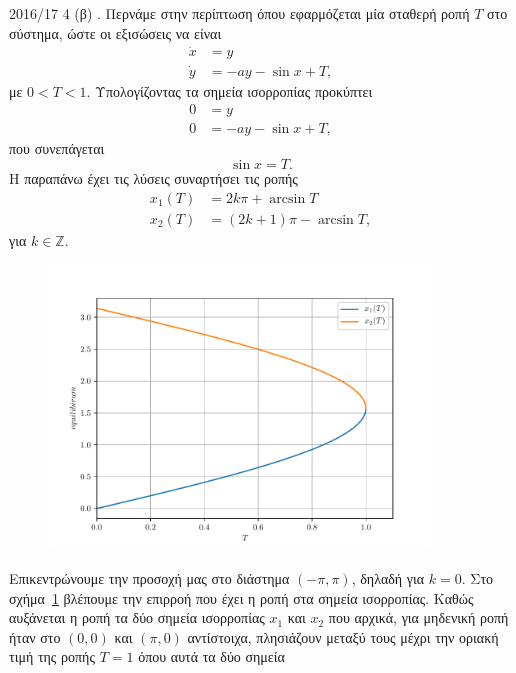 \begin{solution}{2016/17 4}
    (β) . Περνάμε στην περίπτωση όπου εφαρμόζεται μία σταθερή ροπή
    \( T \) στο σύστημα, ώστε οι εξισώσεις να είναι
    \begin{align*}
        \dot{x} &= y \\
        \dot{y} &= -a y - \sin{x} + T,
    \end{align*}
    με \( 0 < T < 1 \). Υπολογίζοντας τα σημεία ισορροπίας προκύπτει
    \begin{align*}
        0 &= y \\
        0 &= -a y - \sin{x} + T,
    \end{align*}
    που συνεπάγεται
    \[
        \sin{x} = T.
    \]
    Η παραπάνω έχει τις λύσεις συναρτήσει τις ροπής
    \begin{align*}
        x_1(T) &= 2k\pi + \arcsin{T} \\
        x_2(T) &= (2k + 1)\pi - \arcsin{T},
    \end{align*}
    για \( k \in \mathbb{Z} \).
    \begin{figure}[h]
        \centering
        \includegraphics[width=0.9\textwidth]{figures/ex4_equilibriumPerTorque.pdf}
        \caption{}
        \label{fig:ex4_equilibriumPerTorque}
    \end{figure}
    Επικεντρώνουμε την προσοχή μας στο διάστημα \( (-\pi, \pi) \), δηλαδή για
    \( k = 0 \). Στο σχήμα~\ref{fig:ex4_equilibriumPerTorque} βλέπουμε την
    επιρροή που έχει η ροπή στα σημεία ισορροπίας. Καθώς αυξάνεται η ροπή τα
    δύο σημεία ισορροπίας \( x_1 \) και \( x_2 \) που αρχικά, για μηδενική
    ροπή ήταν στο \( (0, 0) \) και \( (\pi, 0) \) αντίστοιχα, πλησιάζουν μεταξύ τους
    μέχρι την οριακή τιμή της ροπής \( T = 1 \) όπου αυτά τα δύο σημεία

\end{solution}
